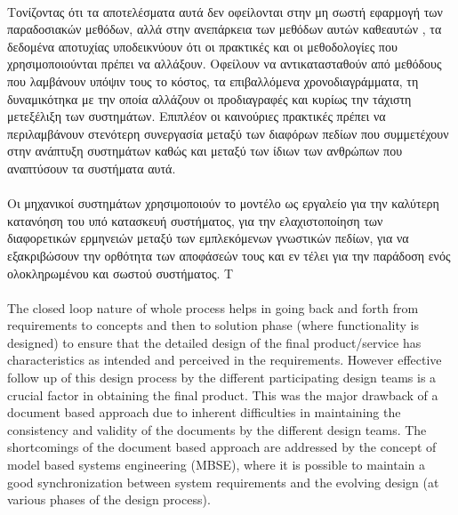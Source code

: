 \documentclass[a4paper,12pt,twoside]{report}
\begin{document}
			\paragraph{} {Τονίζοντας ότι τα αποτελέσματα αυτά δεν οφείλονται στην μη σωστή εφαρμογή των παραδοσιακών μεθόδων, αλλά στην ανεπάρκεια των μεθόδων αυτών καθεαυτών \cite{MDSysDevelIBM}, τα δεδομένα αποτυχίας υποδεικνύουν ότι οι πρακτικές και οι μεθοδολογίες που χρησιμοποιούνται πρέπει να αλλάξουν. Οφείλουν να αντικατασταθούν από μεθόδους που λαμβάνουν υπόψιν τους το κόστος, τα επιβαλλόμενα χρονοδιαγράμματα, τη δυναμικότηκα με την οποία αλλάζουν οι προδιαγραφές και κυρίως την τάχιστη μετεξέλιξη των συστημάτων. Επιπλέον οι καινούριες πρακτικές πρέπει να περιλαμβάνουν στενότερη συνεργασία μεταξύ των διαφόρων πεδίων που συμμετέχουν στην ανάπτυξη συστημάτων καθώς και μεταξύ των ίδιων των ανθρώπων που αναπτύσουν τα συστήματα αυτά. 
			}
			
			\paragraph{} {Οι μηχανικοί συστημάτων χρησιμοποιούν το μοντέλο ως εργαλείο για την καλύτερη κατανόηση του υπό κατασκευή συστήματος, για την ελαχιστοποίηση των διαφορετικών ερμηνειών μεταξύ των εμπλεκόμενων γνωστικών πεδίων, για να εξακριβώσουν την ορθότητα των αποφάσεών τους και εν τέλει για την παράδοση ενός ολοκληρωμένου και σωστού συστήματος. Τ
			}
			
			\paragraph{} {\cite{IntegratedApproachMBMechatronicDesign}}
			
			\paragraph{} {The closed loop nature of whole process helps in going back and forth from requirements to concepts and then to solution phase (where functionality is designed) to ensure that the detailed design of the final product/service has characteristics as intended and perceived in the requirements. However effective follow up of this design process by the different participating design teams is a crucial factor in obtaining the final product. This was the major drawback of a document based  approach due to inherent difficulties in maintaining the consistency and validity of the documents by the different design teams. The shortcomings of the document based approach are addressed by the concept of model based systems engineering (MBSE), where it is possible to maintain a good synchronization between system requirements and the evolving design (at various phases of the design process). \cite{ModelBasedBMechatronisSysMLMatlab}
			}
			
\end{document}

